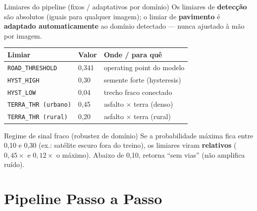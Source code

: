 \documentclass{beamer}
\begin{document}
\begin{frame}[fragile]{Limiares do pipeline (fixos / adaptativos por domínio)}
    \footnotesize Os limiares de \textbf{detecção} são absolutos (iguais para qualquer imagem); o limiar de \textbf{pavimento} é \textbf{adaptado automaticamente} ao domínio detectado --- nunca ajustado à mão por imagem.
    \vspace{0.1cm}
    \begin{tabular}{lll}
        \toprule
        \textbf{Limiar} & \textbf{Valor} & \textbf{Onde / para quê} \\
        \midrule
        \texttt{ROAD\_THRESHOLD} & 0,341 & operating point do modelo \\
        \texttt{HYST\_HIGH} & 0,30 & semente forte (hysteresis) \\
        \texttt{HYST\_LOW} & 0,04 & trecho fraco conectado \\
        \texttt{TERRA\_THR (urbano)} & 0,45 & asfalto $\times$ terra (denso) \\
        \texttt{TERRA\_THR (rural)} & 0,20 & asfalto $\times$ terra (rural) \\
        \bottomrule
    \end{tabular}
    \vspace{0.1cm}
    \begin{block}{Regime de sinal fraco (robustez de domínio)}
        \scriptsize Se a probabilidade máxima fica entre 0,10 e 0,30 (ex.: satélite escuro fora do treino), os limiares viram \textbf{relativos} ($0{,}45\times$ e $0{,}12\times$ o máximo). Abaixo de 0,10, retorna ``sem vias'' (não amplifica ruído).
    \end{block}
\end{frame}

\section{Pipeline Passo a Passo}
\end{document}
